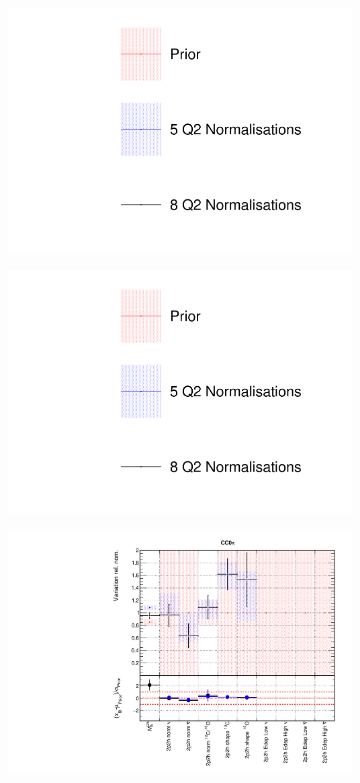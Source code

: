 \begin{figure}
\centering
\begin{subfigure}{0.3\textwidth}
  \centering
  \includegraphics[width=1.0\linewidth, trim={5mm  130mm 0mm 10mm}, clip]{figs/comp5q2vs8q2_leg}
\end{subfigure}
\begin{subfigure}{0.3\textwidth}
  \centering
  \includegraphics[width=1.0\linewidth, trim={5mm  0mm 0mm 70mm}, clip]{figs/comp5q2vs8q2_leg}
\end{subfigure}
\begin{subfigure}{0.49\textwidth}
  \centering
  \includegraphics[width=0.9\linewidth]{figs/comp5q2vs8q2xsec1}

\end{subfigure}
\end{figure}
